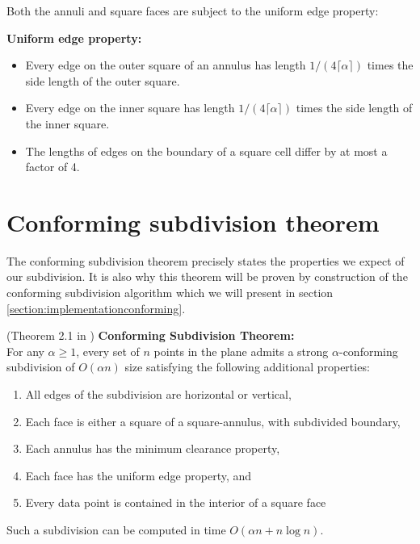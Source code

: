 Both the annuli and square faces are subject to the uniform edge property:

\begin{mydef} \textbf{Uniform edge property:} 
\begin{itemize}
	\itemsep0em 
	\item Every edge on the outer square of an annulus has length
		  $1/(4\lceil \alpha \rceil)$ times the side length of the outer square.
	\item Every edge on the inner square has length $1/(4\lceil\alpha\rceil)$ times
		  the side length of the inner square.
	\item The lengths of edges on the boundary of a square cell differ by at
		  most a factor of 4.
\end{itemize}
\end{mydef}

\section{Conforming subdivision theorem}

The conforming subdivision theorem precisely states the properties we expect of our 
subdivision. It is also why this theorem will be proven by construction of the 
conforming subdivision algorithm which we will present in section 
\ref{section:implementationconforming}.

\begin{theorem}
	\label{theorem:conformingsubdivision}
	(Theorem 2.1 in \cite{HershbergerS99}) \textbf{Conforming Subdivision Theorem:} \\
	For any $\alpha\geq 1$, every set of $n$ points in the plane admits a strong
	$\alpha$-conforming subdivision of $O(\alpha n)$ size satisfying the
	following additional properties:
\begin{enumerate}	
	\item All edges of the subdivision are horizontal or vertical,
	\item Each face is either a square of a square-annulus, with subdivided
		boundary,
	\item Each annulus has the minimum clearance property,
	\item Each face has the uniform edge property, and
	\item Every data point is contained in the interior of a square face
\end{enumerate}
	Such a subdivision can be computed in time $O(\alpha n + n\log n)$.
\end{theorem}

